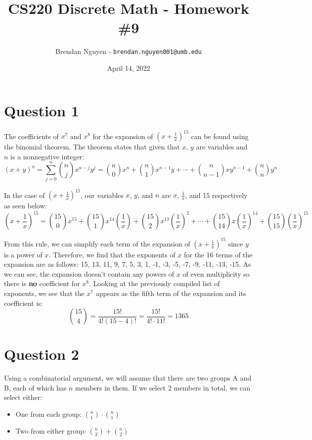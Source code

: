 \documentclass[letterpaper, 12pt]{article}
\title{CS220 Discrete Math - Homework \#9}
\author{Brendan Nguyen - \texttt{brendan.nguyen001@umb.edu}}
\date{April 14, 2022}
\begin{document}
\maketitle

\section*{Question 1}
The coefficients of $x^7$ and $x^8$ for the expansion of $(x + \frac{1}{x})^{15}$ can be found using the binomial theorem. The theorem states that given that $x$, $y$ are variables and $n$ is a nonnegative integer:
\[(x+y)^n = \sum_{j=0}^{n} \binom{n}{j}x^{n-j}y^j = \binom{n}{0}x^n + \binom{n}{1}x^{n-1}y + \cdots + \binom{n}{n-1}xy^{n-1} + \binom{n}{n}y^n\]

In the case of $(x + \frac{1}{x})^{15}$, our variables $x$, $y$, and $n$ are $x$, $\frac{1}{x}$, and 15 respectively as seen below:
\[\left(x+ \frac{1}{x}\right)^{15} = \binom{15}{0}x^{15} + \binom{15}{1}x^{14}\left(\frac{1}{x}\right) + \binom{15}{2}x^{13}\left(\frac{1}{x}\right)^2 + \cdots + \binom{15}{14}x\left(\frac{1}{x}\right)^{14} + \binom{15}{15}\left(\frac{1}{x}\right)^{15}\]

From this rule, we can simplify each term of the expansion of $(x + \frac{1}{x})^{15}$ since $y$ is a power of $x$. Therefore, we find that the exponents of $x$ for the 16 terms of the expansion are as follows: 15, 13, 11, 9, 7, 5, 3, 1, -1, -3, -5, -7, -9, -11, -13, -15. As we can see, the expansion doesn't contain any powers of $x$ of even multiplicity so there is \textbf{no} coefficient for $x^8$. Looking at the previously compiled list of exponents, we see that the $x^7$ appears as the fifth term of the expansion and its coefficient is:
\[\binom{15}{4} = \frac{15!}{4!(15-4)!} = \frac{15!}{4! \cdot 11!} = 1365\]

\section*{Question 2}
Using a combinatorial argument, we will assume that there are two groups A and B, each of which has $n$ members in them. If we select 2 members in total, we can select either:

\begin{itemize}
    \item One from each group: $\binom{n}{1} \cdot \binom{n}{1}$
    \item Two from either group: $\binom{n}{2} + \binom{n}{2}$
\end{itemize}
\end{document}
